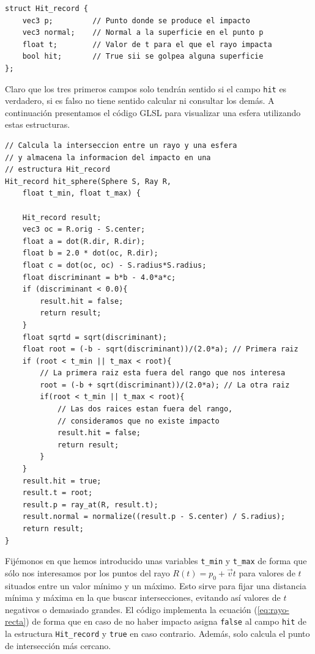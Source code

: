 \begin{lstlisting}
struct Hit_record {
    vec3 p;         // Punto donde se produce el impacto
    vec3 normal;    // Normal a la superficie en el punto p
    float t;        // Valor de t para el que el rayo impacta
    bool hit;       // True sii se golpea alguna superficie
};
\end{lstlisting}

Claro que los tres primeros campos solo tendrán sentido si el campo \verb|hit| es verdadero, si es falso no tiene sentido calcular ni consultar los demás. A continuación presentamos el código GLSL para visualizar una esfera utilizando estas estructuras.

\begin{lstlisting}
// Calcula la interseccion entre un rayo y una esfera
// y almacena la informacion del impacto en una
// estructura Hit_record
Hit_record hit_sphere(Sphere S, Ray R, 
    float t_min, float t_max) {

    Hit_record result;
    vec3 oc = R.orig - S.center;
    float a = dot(R.dir, R.dir);
    float b = 2.0 * dot(oc, R.dir);
    float c = dot(oc, oc) - S.radius*S.radius;
    float discriminant = b*b - 4.0*a*c;
    if (discriminant < 0.0){
        result.hit = false;
        return result;
    }
    float sqrtd = sqrt(discriminant);
    float root = (-b - sqrt(discriminant))/(2.0*a); // Primera raiz
    if (root < t_min || t_max < root){ 
        // La primera raiz esta fuera del rango que nos interesa
        root = (-b + sqrt(discriminant))/(2.0*a); // La otra raiz
        if(root < t_min || t_max < root){ 
            // Las dos raices estan fuera del rango,
            // consideramos que no existe impacto
            result.hit = false;
            return result;
        }
    } 
    result.hit = true;
    result.t = root;
    result.p = ray_at(R, result.t);
    result.normal = normalize((result.p - S.center) / S.radius);
    return result;
}
\end{lstlisting}

Fijémonos en que hemos introducido unas variables \verb|t_min| y \verb|t_max| de forma que sólo nos interesamos por los puntos del rayo $R(t)=p_0+\vec vt$ para valores de $t$ situados entre un valor mínimo y un máximo. Esto sirve para fijar una distancia mínima y máxima en la que buscar intersecciones, evitando así valores de $t$ negativos o demasiado grandes. El código implementa la ecuación (\ref{eq:rayo-recta}) de forma que en caso de no haber impacto asigna \verb|false| al campo \verb|hit| de la estructura \verb|Hit_record| y \verb|true| en caso contrario. Además, solo calcula el punto de intersección más cercano.


